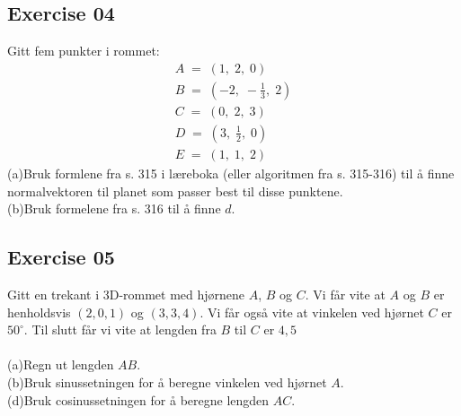 \documentclass[12pt, a4paper]{article}
\begin{document}
\newpage\quad
\subsection*{Exercise 04}
Gitt fem punkter i rommet:
	\begin{gather}
		\tag*{}
			A\;=\;(1,\;2,\;0)\\
		\tag*{}
			B\;=\;\left(-2,\;-\frac{1}{3},\;2\right)\\
		\tag*{}
			C\;=\;(0,\;2,\;3)\\
		\tag*{}
			D\;=\;\left(3,\;\frac{1}{2},\;0\right)\\
		\tag*{}
			E\;=\;(1,\;1,\;2)
	\end{gather}
	(a)\quad Bruk formlene fra s. 315 i læreboka (eller
	algoritmen fra s. 315-316) til å finne normalvektoren til
	planet som passer best til disse punktene.
			\begin{equation}
				\tag*{}
			\end{equation}
	(b)\quad Bruk formelene fra s. 316 til å finne $d$.
			\begin{equation}
				\tag*{}
			\end{equation}
	
\subsection*{Exercise 05}
Gitt en trekant i 3D-rommet med hjørnene $A$, $B$ og $C$.
Vi får vite at $A$ og $B$ er henholdsvis $(2, 0, 1)$ og
$(3, 3, 4)$. Vi får også vite at vinkelen ved hjørnet $C$ er $50^\circ$. Til slutt får vi vite at lengden fra $B$ til $C$ er 
$4,5$\\\\
	(a)\quad Regn ut lengden $AB$.
			\begin{equation}
				\tag*{}
			\end{equation}
	(b)\quad Bruk sinussetningen for å beregne vinkelen
	ved hjørnet $A$.
			\begin{equation}
				\tag*{}
			\end{equation}
	(d)\quad Bruk cosinussetningen for å beregne lengden $AC$.
			\begin{equation}
				\tag*{}
			\end{equation}

\newpage\quad
\end{document}
